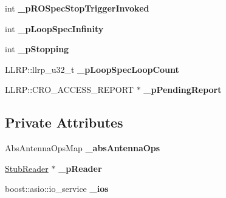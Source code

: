 \begin{DoxyCompactItemize}
\item 
\hypertarget{class_e_l_f_i_n_1_1_reader_operation_ab1742729d91085bd6252a73b191cb951}{int {\bfseries \-\_\-p\-R\-O\-Spec\-Stop\-Trigger\-Invoked}}\label{class_e_l_f_i_n_1_1_reader_operation_ab1742729d91085bd6252a73b191cb951}

\item 
\hypertarget{class_e_l_f_i_n_1_1_reader_operation_a17e5e692c72d0356525312f7a9ae57ab}{int {\bfseries \-\_\-p\-Loop\-Spec\-Infinity}}\label{class_e_l_f_i_n_1_1_reader_operation_a17e5e692c72d0356525312f7a9ae57ab}

\item 
\hypertarget{class_e_l_f_i_n_1_1_reader_operation_a3f8a539a269ffcaaa5c7c8890807fe32}{int {\bfseries \-\_\-p\-Stopping}}\label{class_e_l_f_i_n_1_1_reader_operation_a3f8a539a269ffcaaa5c7c8890807fe32}

\item 
\hypertarget{class_e_l_f_i_n_1_1_reader_operation_a617b9e2bb5726139853e9019b67c3604}{L\-L\-R\-P\-::llrp\-\_\-u32\-\_\-t {\bfseries \-\_\-p\-Loop\-Spec\-Loop\-Count}}\label{class_e_l_f_i_n_1_1_reader_operation_a617b9e2bb5726139853e9019b67c3604}

\item 
\hypertarget{class_e_l_f_i_n_1_1_reader_operation_a4a33537c6ece003612b2a1c988956e89}{L\-L\-R\-P\-::\-C\-R\-O\-\_\-\-A\-C\-C\-E\-S\-S\-\_\-\-R\-E\-P\-O\-R\-T $\ast$ {\bfseries \-\_\-p\-Pending\-Report}}\label{class_e_l_f_i_n_1_1_reader_operation_a4a33537c6ece003612b2a1c988956e89}

\end{DoxyCompactItemize}
\subsection*{Private Attributes}
\begin{DoxyCompactItemize}
\item 
\hypertarget{class_e_l_f_i_n_1_1_reader_operation_afd6f893ea67b5d664cac65e3fe207b00}{Abs\-Antenna\-Ops\-Map {\bfseries \-\_\-abs\-Antenna\-Ops}}\label{class_e_l_f_i_n_1_1_reader_operation_afd6f893ea67b5d664cac65e3fe207b00}

\item 
\hypertarget{class_e_l_f_i_n_1_1_reader_operation_a48f616a5c2c5712aba164a2f77c1a085}{\hyperlink{class_e_l_f_i_n_1_1_stub_reader}{Stub\-Reader} $\ast$ {\bfseries \-\_\-p\-Reader}}\label{class_e_l_f_i_n_1_1_reader_operation_a48f616a5c2c5712aba164a2f77c1a085}

\item 
\hypertarget{class_e_l_f_i_n_1_1_reader_operation_a0fcbccaea1ab2f9e6805e96a64328840}{boost\-::asio\-::io\-\_\-service {\bfseries \-\_\-ios}}\label{class_e_l_f_i_n_1_1_reader_operation_a0fcbccaea1ab2f9e6805e96a64328840}

\end{DoxyCompactItemize}
